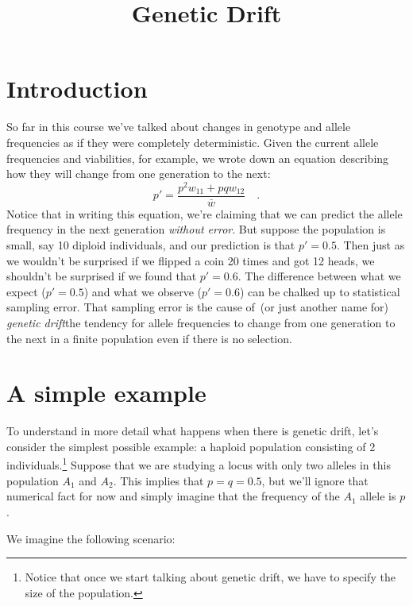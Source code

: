 \documentclass[12pt]{article}
\title{Genetic Drift}
\begin{document}
\maketitle

\thispagestyle{first}

\section*{Introduction}

So far in this course we've talked about changes in genotype and
allele frequencies as if they were completely deterministic. Given the
current allele frequencies and viabilities, for example, we wrote down
an equation describing how they will change from one generation to the
next:
\[
p' = \frac{p^2w_{11} + pqw_{12}}{\bar w} \quad .
\]
Notice that in writing this equation, we're claiming that we can
predict the allele frequency in the next generation {\it without
error}. But suppose the population is small, say 10 diploid
individuals, and our prediction is that $p' = 0.5$. Then just as we
wouldn't be surprised if we flipped a coin 20 times and got 12 heads,
we shouldn't be surprised if we found that $p' = 0.6$. The difference
between what we expect ($p' = 0.5$) and what we observe ($p' = 0.6$)
can be chalked up to statistical sampling error. That sampling error
is the cause of~(or just another name for) {\it genetic
drift}{\dash}the tendency for allele frequencies to change from one
generation to the next in a finite population even if there is no
selection.

\section*{A simple example}

To understand in more detail what happens when there is genetic drift,
let's consider the simplest possible example: a haploid population
consisting of 2 individuals.\footnote{Notice that once we start
  talking about genetic drift, we have to specify the size of the
  population.} Suppose that we are studying a locus with only two
alleles in this population $A_1$ and $A_2$. This implies that $p = q =
0.5$, but we'll ignore that numerical fact for now and simply imagine
that the frequency of the $A_1$ allele is $p$.

We imagine the following scenario:
\end{document}
